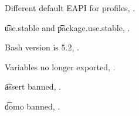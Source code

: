 \begin{compactitem}
\item Different default EAPI for profiles, .
\item \t{use.stable} and \t{package.use.stable}, .
\item Bash version is 5.2, .
\item Variables no longer exported, .
\item \t{assert} banned, .
\item \t{domo} banned, .
\end{compactitem}



